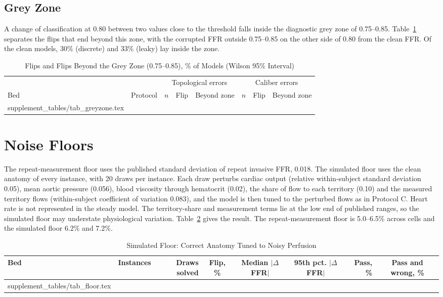 \documentclass[journal,onecolumn,11pt]{IEEEtran}
\begin{document}
\subsection{Grey Zone}\label{sec:grey}
A change of classification at 0.80 between two values close to the threshold falls inside the diagnostic grey zone
of 0.75--0.85. Table~\ref{tab:grey} separates the flips that end beyond this zone, with the corrupted FFR outside
0.75--0.85 on the other side of 0.80 from the clean FFR. Of the clean models, 30\% (discrete) and 33\% (leaky) lay
inside the zone.
\begin{table}[!ht]
\caption{Flips and Flips Beyond the Grey Zone (0.75--0.85), \% of Models (Wilson 95\% Interval)}\label{tab:grey}
\centering\footnotesize
\begin{tabular}{@{}llrccrcc@{}}
\toprule
 & & \multicolumn{3}{c}{Topological errors} & \multicolumn{3}{c}{Caliber errors}\\
\cmidrule(lr){3-5}\cmidrule(l){6-8}
Bed & Protocol & $n$ & Flip & Beyond zone & $n$ & Flip & Beyond zone\\
\midrule
{} supplement_tables/tab_greyzone.tex 
\bottomrule
\end{tabular}
\end{table}

\FloatBarrier
\section{Noise Floors}\label{sec:floor}
The repeat-measurement floor uses the published standard deviation of repeat invasive FFR, 0.018. The simulated floor
uses the clean anatomy of every instance, with 20 draws per instance. Each draw perturbs cardiac output (relative
within-subject standard deviation 0.05), mean aortic pressure (0.056), blood viscosity through hematocrit (0.02), the
share of flow to each territory (0.10) and the measured territory flows (within-subject coefficient of variation
0.083), and the model is then tuned to the perturbed flows as in Protocol C. Heart rate is not represented in the
steady model. The territory-share and measurement terms lie at the low end of published ranges, so the simulated floor
may understate physiological variation. Table~\ref{tab:floor} gives the result. The repeat-measurement floor is
5.0--6.5\% across cells and the simulated floor 6.2\% and 7.2\%.
\begin{table}[!ht]
\caption{Simulated Floor: Correct Anatomy Tuned to Noisy Perfusion}\label{tab:floor}
\centering\small
\begin{tabular}{@{}lrrcccrc@{}}
\toprule
Bed & Instances & Draws solved & Flip, \% & Median $|\Delta$FFR$|$ & 95th pct. $|\Delta$FFR$|$ & Pass, \% &
Pass and wrong, \%\\
\midrule
{} supplement_tables/tab_floor.tex 
\bottomrule
\end{tabular}
\end{table}
\end{document}
